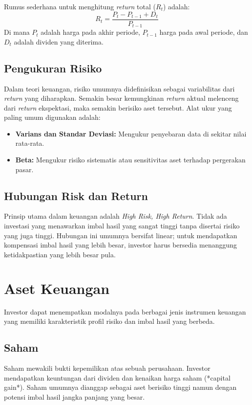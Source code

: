 \documentclass[12pt,a4paper]{book}
\begin{document}
Rumus sederhana untuk menghitung \textit{return} total ($R_t$) adalah:
\begin{equation}
    R_t = \frac{P_t - P_{t-1} + D_t}{P_{t-1}}
\end{equation}
Di mana $P_t$ adalah harga pada akhir periode, $P_{t-1}$ harga pada awal periode, dan $D_t$ adalah dividen yang diterima.

\subsection{Pengukuran Risiko}
Dalam teori keuangan, risiko umumnya didefinisikan sebagai variabilitas dari \textit{return} yang diharapkan. Semakin besar kemungkinan \textit{return} aktual melenceng dari \textit{return} ekspektasi, maka semakin berisiko aset tersebut.
Alat ukur yang paling umum digunakan adalah:
\begin{itemize}
    \item \textbf{Varians dan Standar Deviasi:} Mengukur penyebaran data di sekitar nilai rata-rata.
    \item \textbf{Beta:} Mengukur risiko sistematis atau sensitivitas aset terhadap pergerakan pasar.
\end{itemize}

\subsection{Hubungan Risk dan Return}
Prinsip utama dalam keuangan adalah \textit{High Risk, High Return}. Tidak ada investasi yang menawarkan imbal hasil yang sangat tinggi tanpa disertai risiko yang juga tinggi. Hubungan ini umumnya bersifat linear; untuk mendapatkan kompensasi imbal hasil yang lebih besar, investor harus bersedia menanggung ketidakpastian yang lebih besar pula.

\section{Aset Keuangan}
Investor dapat menempatkan modalnya pada berbagai jenis instrumen keuangan yang memiliki karakteristik profil risiko dan imbal hasil yang berbeda.

\subsection{Saham}
Saham mewakili bukti kepemilikan atas sebuah perusahaan. Investor mendapatkan keuntungan dari dividen dan kenaikan harga saham (*capital gain*). Saham umumnya dianggap sebagai aset berisiko tinggi namun dengan potensi imbal hasil jangka panjang yang besar.
\end{document}
